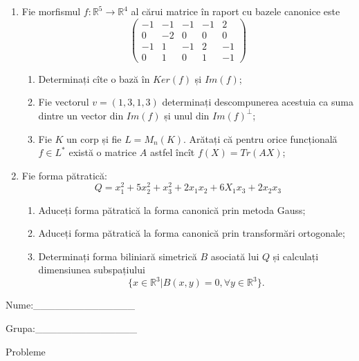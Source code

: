 \documentclass{article}
\begin{document}
\begin{enumerate}
 \item Fie morfismul $f:\mathbb{R}^5 \to \mathbb{R}^4$ al cărui matrice în raport cu bazele canonice este
$$\begin{pmatrix}
-1&-1&-1&-1&2\\
0&-2&0&0&0\\
-1&1&-1&2&-1\\
0&1&0&1&-1
\end{pmatrix}$$

\begin{enumerate}
\item Determinați cîte o bază în $Ker(f)$ și $Im(f)$;
\item Fie vectorul $v=(1,3,1,3)$ determinați descompunerea acestuia ca suma dintre un vector din $Im(f)$ și unul din $Im(f)^\perp$;
\item Fie $K$ un corp și fie $L=M_n(K)$. Arătați că pentru orice funcțională $f \in L^*$ există o matrice $A$ astfel încît $f(X)=Tr(AX)$;
\end{enumerate}
\item Fie forma pătratică:
$$Q= x_1^2+5x_2^2+x_3^2+2x_1x_2+6X_1x_3+2x_2x_3$$

\begin{enumerate}
\item Aduceți forma pătratică la forma canonică prin metoda Gauss;
\item Aduceți forma pătratică la forma canonică prin transformări ortogonale;
\item Determinați forma biliniară simetrică $B$ asociată lui $Q$ și calculați dimensiunea subspațiului
$$\{x \in \mathbb{R}^3 | B(x,y)=0,\forall y \in \mathbb{R}^3\}.$$

\end{enumerate}
\end{enumerate}
\newpage
\begin{flushright}
Nume:\_\_\_\_\_\_\_\_\_\_\_\_\_\_
 
 
Grupa:\_\_\_\_\_\_\_\_\_\_\_\_\_\_
\end{flushright}
\begin{center}
\vspace{2cm}
{\Large Probleme}
\vspace{2cm}
\end{center}
\end{document}
